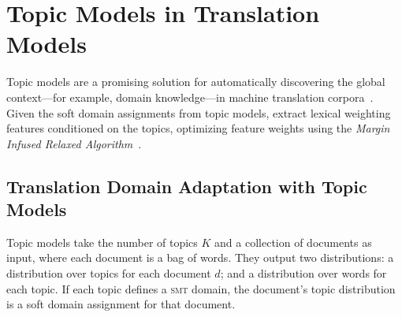 \section{Topic Models in Translation Models}


Topic models are a promising solution for automatically discovering the global context---for example, domain knowledge---in machine translation corpora~\citep{Eidelman-12,hu-14}. Given the soft domain assignments from topic models, \citet{Eidelman-12} extract lexical weighting features conditioned on the topics, optimizing feature weights using the \emph{Margin Infused Relaxed Algorithm}~\citep[\textsc{mira}]{Crammer-06}.

\subsection{Translation Domain Adaptation with Topic Models}

Topic models take the number of topics $K$ and a collection of documents as input, where each document is a bag of words. They output two distributions: a distribution over topics for each document $d$; and a distribution over words for each topic. If each topic defines a \textsc{smt} domain, the document's topic distribution is a soft domain assignment for that document.

